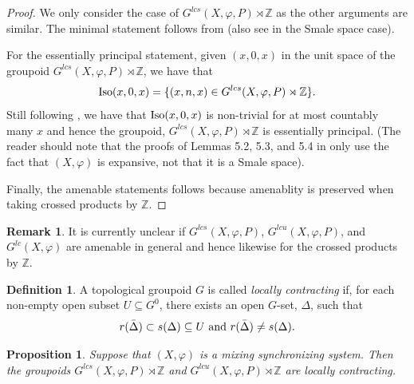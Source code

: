\documentclass{amsart}
\newcommand{\Z}{{\mathbb Z}}
\theoremstyle{plain}
\newtheorem{proposition}[theorem]{Proposition}
\theoremstyle{definition}
\newtheorem{definition}[theorem]{Definition}
\newtheorem{remark}[theorem]{Remark}
\theoremstyle{remark}
\begin{document}
\begin{proof}
We only consider the case of $G^{lcs}(X, \varphi, P) \rtimes \Z$ as the other arguments are similar. The minimal statement follows from \cite[Lemma 4.9]{DeeSto} (also see \cite[Lemma 5.1]{putnam99} in the Smale space case). 

For the essentially principal statement, given $(x, 0, x)$ in the unit space of the groupoid $G^{lcs}(X, \varphi, P) \rtimes \Z$, we have that
\[
{\rm Iso}(x, 0, x)= \{ (x, n, x) \in G^{lcs}(X, \varphi, P) \rtimes \Z \}.
\]
Still following \cite[Proof of 1.4 on page 20]{putnam99}, we have that ${\rm Iso}(x,0,x)$ is non-trivial for at most countably many $x$ and hence the groupoid, $G^{lcs}(X, \varphi, P) \rtimes \Z$ is essentially principal. (The reader should note that the proofs of Lemmas 5.2, 5.3, and 5.4 in \cite{putnam99} only use the fact that $(X, \varphi)$ is expansive, not that it is a Smale space).

Finally, the amenable statements follows because amenablity is preserved when taking crossed products by $\Z$.
\end{proof}
\begin{remark}
It is currently unclear if $G^{lcs}(X, \varphi, P)$, $G^{lcu}(X, \varphi, P)$, and $G^{lc}(X, \varphi)$ are amenable in general and hence likewise for the crossed products by $\Z$. 
\end{remark}
\begin{definition}
A topological groupoid $G$ is called \emph{locally contracting} if, for each non-empty open subset $U \subseteq G^{0}$, there exists an open $G$-set, $\Delta$, such that
\[ r(\bar{\Delta}) \subset s(\Delta) \subseteq U \hbox{ and }r(\bar{\Delta}) \neq s(\Delta).
\]
\end{definition}
\begin{proposition}
Suppose that $(X, \varphi)$ is a mixing synchronizing system. Then the groupoids $G^{lcs}(X, \varphi, P) \rtimes \Z$ and $G^{lcu}(X, \varphi, P) \rtimes \Z$ are locally contracting.
\end{proposition}
\end{document}
